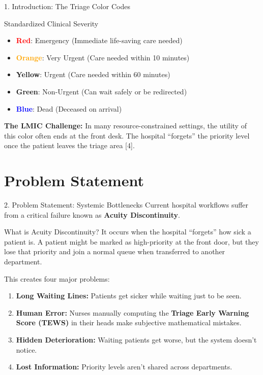 \documentclass[11pt, aspectratio=169]{beamer}
\begin{document}
	\begin{frame}{1. Introduction: The Triage Color Codes}
		\begin{block}{Standardized Clinical Severity}
			\begin{itemize}
				\item \textbf{\textcolor{red}{Red}}: Emergency (Immediate life-saving care needed)
				\item \textbf{\textcolor{orange}{Orange}}: Very Urgent (Care needed within 10 minutes)
				\item \textbf{\textcolor{yellow!90!black}{Yellow}}: Urgent (Care needed within 60 minutes)
				\item \textbf{\textcolor{green!60!black}{Green}}: Non-Urgent (Can wait safely or be redirected)
				\item \textbf{\textcolor{blue}{Blue}}: Dead (Deceased on arrival)
			\end{itemize}
		\end{block}
		
		\vspace{0.3cm}
		\textbf{The LMIC Challenge:}
		In many resource-constrained settings, the utility of this color often ends at the front desk. The hospital ``forgets'' the priority level once the patient leaves the triage area [4].
	\end{frame}
	
	\section{Problem Statement}
	\begin{frame}{2. Problem Statement: Systemic Bottlenecks}
		Current hospital workflows suffer from a critical failure known as \textbf{Acuity Discontinuity}. 
		\vspace{0.2cm}
		\begin{block}{What is Acuity Discontinuity?}
			It occurs when the hospital ``forgets'' how sick a patient is. A patient might be marked as high-priority at the front door, but they lose that priority and join a normal queue when transferred to another department.
		\end{block}
		\vspace{0.2cm}
		This creates four major problems:
		\begin{enumerate}
			\item \textbf{Long Waiting Lines:} Patients get sicker while waiting just to be seen.
			\item \textbf{Human Error:} Nurses manually computing the \textbf{Triage Early Warning Score (TEWS)} in their heads make subjective mathematical mistakes.
			\item \textbf{Hidden Deterioration:} Waiting patients get worse, but the system doesn't notice.
			\item \textbf{Lost Information:} Priority levels aren't shared across departments.
		\end{enumerate}
	\end{frame}
	
\end{document}
